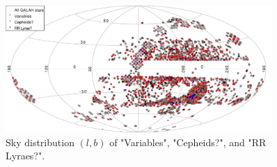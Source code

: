 \documentclass[]{aa}
\begin{document}
\begin{figure}[h!]
\centering
  \includegraphics[width=0.9\textwidth]{Figures/variability_l_b.pdf}
    \caption{Sky distribution $(l,b)$ of "Variables", "Cepheids?", and "RR Lyraes?".}
    \label{fig:figure4}
\end{figure}

%

%




\label{LastPage}
\end{document}

